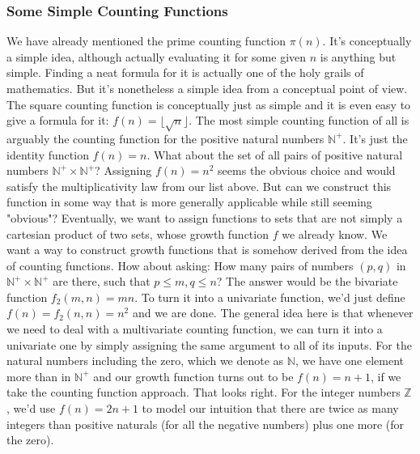 \documentclass[12pt]{article}
\begin{document}
\subsubsection{Some Simple Counting Functions}
We have already mentioned the prime counting function $\pi(n)$. It's conceptually a simple idea, although actually evaluating it for some given $n$ is anything but simple. Finding a neat formula for it is actually one of the holy grails of mathematics. But it's nonetheless a simple idea from a conceptual point of view. The square counting function is conceptually just as simple and it is even easy to give a formula for it: $f(n) = \lfloor \sqrt{n} \rfloor$. The most simple counting function of all is arguably the counting function for the positive natural numbers $\mathbb{N}^+$. It's just the identity function $f(n) = n$. What about the set of all pairs of positive natural numbers $\mathbb{N}^+ \times \mathbb{N}^+$? Assigning $f(n) = n^2$ seems the obvious choice and would satisfy the multiplicativity law from our list above. But can we construct this function in some way that is more generally applicable while still seeming "obvious"? Eventually, we want to assign functions to sets that are not simply a cartesian product of two sets, whose growth function $f$ we already know. We want a way to construct growth functions that is somehow derived from the idea of counting functions. How about asking: How many pairs of numbers $(p,q)$ in  $\mathbb{N}^+ \times \mathbb{N}^+$ are there, such that $p \leq m, q \leq n$? The answer would be the bivariate function $f_2(m,n) = m n$. To turn it into a univariate function, we'd just define $f(n) = f_2(n,n) = n^2$ and we are done. The general idea here is that whenever we need to deal with a multivariate counting function, we can turn it into a univariate one by simply assigning the same argument to all of its inputs. For the natural numbers including the zero, which we denote as $\mathbb{N}$, we have one element more than in $\mathbb{N}^+$ and our growth function turns out to be $f(n) = n+1$, if we take the counting function approach. That looks right. For the integer numbers $\mathbb{Z}$, we'd use $f(n) = 2 n + 1$ to model our intuition that there are twice as many integers than positive naturals (for all the negative numbers) plus one more (for the zero).

\end{document}
